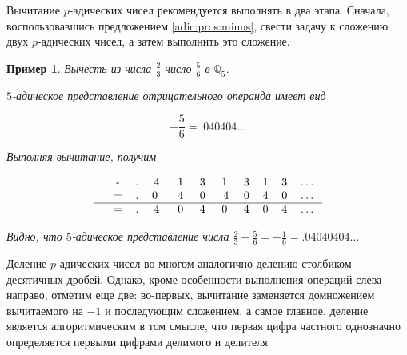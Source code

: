 \documentclass[master, och, diploma, times]{sty/SCWorks}
\theoremstyle{plain}
\newtheorem{exmp}{Пример}[section]
\theoremstyle{definition}
\numberwithin{equation}{section}
\begin{document}
Вычитание $p$-адических чисел рекомендуется выполнять в два этапа. Сначала, воспользовавшись предложением \ref{adic:pros:minus}, свести задачу к сложению двух $p$-адических чисел, а затем выполнить это сложение.

\begin{exmp}
Вычесть из числа $\frac{2}{3}$ число $\frac{5}{6}$ в $\mathbb{Q}_5$.

\noindent $5$-адическое представление отрицательного операнда имеет вид

$$
-\frac{5}{6}=.040404\dots
$$

\noindent Выполняя вычитание, получим

$$
\begin{tabular}{cccccccccccc}
& - & . & 4\; & 1\; & 3\; & 1\; & 3 & 1 & 3 & \dots \\
& = & . & 0 \; & 4\; & 0\; & 4 & 0 & 4 & 0 & \dots \\
\hline
& = & . & 4\; & 0\; & 4\; & 0\; & 4 & 0 & 4 & \dots
\end{tabular}
$$

\noindent Видно, что $5$-адическое представление числа $\frac{2}{3} - \frac{5}{6}=-\frac{1}{6}=.04040404\dots$
\end{exmp}


Деление $p$-адических чисел во многом аналогично делению столбиком десятичных дробей. Однако, кроме особенности выполнения операций слева направо, отметим еще две: во-первых, вычитание заменяется домножением вычитаемого на $-1$ и последующим сложением, а самое главное, деление является алгоритмическим в том смысле, что первая цифра частного однозначно определяется первыми цифрами делимого и делителя.
\end{document}
